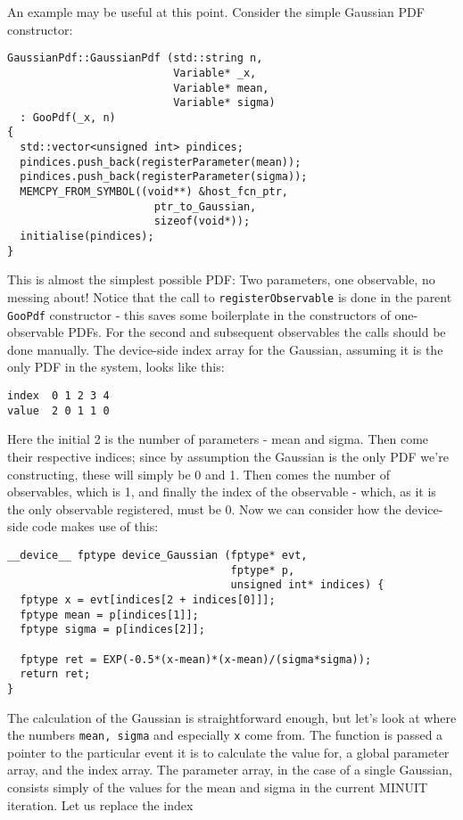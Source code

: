 \documentclass[12pt,pdflatex]{article}
\begin{document}
An example may be useful at this point. Consider the simple Gaussian PDF constructor:
\begin{verbatim}
GaussianPdf::GaussianPdf (std::string n, 
                          Variable* _x, 
                          Variable* mean, 
                          Variable* sigma) 
  : GooPdf(_x, n) 
{
  std::vector<unsigned int> pindices;
  pindices.push_back(registerParameter(mean));
  pindices.push_back(registerParameter(sigma));
  MEMCPY_FROM_SYMBOL((void**) &host_fcn_ptr, 
                       ptr_to_Gaussian, 
                       sizeof(void*));
  initialise(pindices); 
}
\end{verbatim}
This is almost the simplest possible PDF: Two parameters, one observable, 
no messing about! Notice that the call to \verb|registerObservable| is done
in the parent \verb|GooPdf| constructor - this saves some boilerplate
in the constructors of one-observable PDFs. For the second and subsequent
observables the calls should be done manually. The device-side index array
for the Gaussian, assuming it is the only PDF in the system, looks like this:
\begin{verbatim}
index  0 1 2 3 4
value  2 0 1 1 0
\end{verbatim}
Here the initial 2 is the number of parameters - mean and sigma. Then come their
respective indices; since by assumption the Gaussian is the only PDF we're constructing,
these will simply be 0 and 1. Then comes the number of observables, which is 1, and
finally the index of the observable - which, as it is the only observable registered,
must be 0. Now we can consider how the device-side code makes use of this:
\begin{verbatim}
__device__ fptype device_Gaussian (fptype* evt, 
                                   fptype* p, 
                                   unsigned int* indices) {
  fptype x = evt[indices[2 + indices[0]]]; 
  fptype mean = p[indices[1]];
  fptype sigma = p[indices[2]];

  fptype ret = EXP(-0.5*(x-mean)*(x-mean)/(sigma*sigma));
  return ret; 
}
\end{verbatim}
The calculation of the Gaussian is straightforward enough, but let's look
at where the numbers \verb|mean, sigma| and especially \verb|x| come from. 
The function is passed a pointer to the particular event it is to calculate
the value for, a global parameter array, and the index array. The parameter
array, in the case of a single Gaussian, consists simply of the values for
the mean and sigma in the current MINUIT iteration. Let us replace the index
\end{document}
